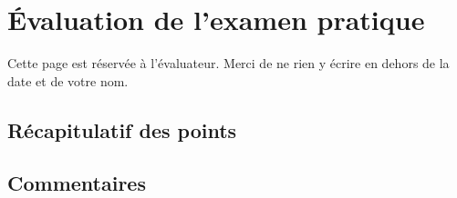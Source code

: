 \documentclass[12pt,addpoints,french,a4paper,oneside]{exam}
\begin{document}
\newpage

\thispagestyle{headandfoot}

\section*{Évaluation de l'examen pratique}

Cette page est réservée à l'évaluateur. Merci de ne rien y écrire en dehors de la date et de votre nom.

\subsection*{Récapitulatif des points}

\begin{center}
	\gradetable[v][questions]
\end{center}

\subsection*{Commentaires}

\end{document}
